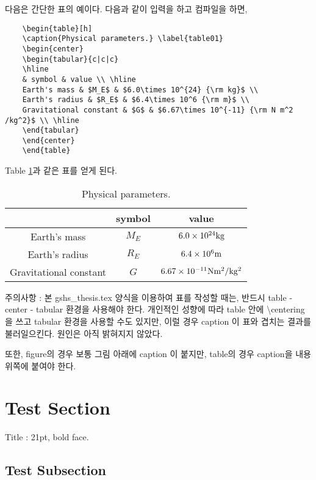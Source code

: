 \documentclass{gshs_thesis}
\begin{document}
다음은 간단한 표의 예이다. 다음과 같이 입력을 하고 컴파일을 하면,
\begin{lstlisting}
	\begin{table}[h]
	\caption{Physical parameters.} \label{table01}
	\begin{center}
	\begin{tabular}{c|c|c}
	\hline
	& symbol & value \\ \hline
	Earth's mass & $M_E$ & $6.0\times 10^{24} {\rm kg}$ \\
	Earth's radius & $R_E$ & $6.4\times 10^6 {\rm m}$ \\
	Gravitational constant & $G$ & $6.67\times 10^{-11} {\rm N m^2 /kg^2}$ \\ \hline
	\end{tabular}
	\end{center}
	\end{table}
\end{lstlisting}
Table \ref{table01}과 같은 표를 얻게 된다.
\begin{table}[h]
\caption{Physical parameters.} \label{table01}
\begin{center}
\begin{tabular}{c|c|c}
\hline
 & symbol & value \\ \hline
Earth's mass & $M_E$ & $6.0\times 10^{24} {\rm kg}$ \\
Earth's radius & $R_E$ & $6.4\times 10^6 {\rm m}$ \\
Gravitational constant & $G$ & $6.67\times 10^{-11} {\rm N m^2 /kg^2}$ \\ \hline
\end{tabular}
\end{center}
\end{table}

주의사항 : 본 gshs\_thesis.tex 양식을 이용하여 표를 작성할 때는, 반드시 table - center - tabular 환경을 사용해야 한다. 개인적인 성향에 따라 table 안에 \textbackslash centering 을 쓰고 tabular 환경을 사용할 수도 있지만, 이럴 경우 caption 이 표와 겹치는 결과를 불러일으킨다. 원인은 아직 밝혀지지 않았다.

또한, figure의 경우 보통 그림 아래에 caption 이 붙지만, table의 경우 caption을 내용 위쪽에 붙여야 한다. 

\section{Test Section}

Title : 21pt, bold face.

\subsection{Test Subsection}
\end{document}
